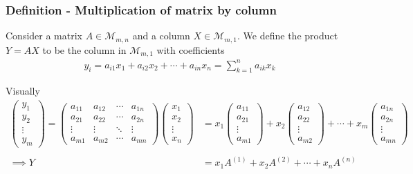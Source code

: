 \documentclass[usenames,dvipsnames,aspectratio=169,10pt]{beamer}
\numberwithin{equation}{section}
\begin{document}
\begin{frame}
\frametitle{Definition - Multiplication of matrix by column}

Consider a matrix $A \in \mathcal{M}_{m,n}$ and a column $X \in \mathcal{M}_{m,1}$. We define the product $Y = AX$ to be the column in $\mathcal{M}_{m,1}$ with coefficients
\begin{align*}
y_i = a_{i1}x_1 + a_{i2}x_2 + \cdots + a_{in}x_n = \sum_{k=1}^n a_{ik} x_k 
\end{align*}

Visually
\begin{align*}
\begin{pmatrix}
y_{1} \\
y_{2} \\
\vdots \\
y_{m} 
\end{pmatrix}
=
\begin{pmatrix}
a_{11} & a_{12} & \cdots & a_{1n} \\
a_{21} & a_{22} & \cdots & a_{2n} \\
\vdots & \vdots & \ddots & \vdots \\
a_{m1} & a_{m2} & \cdots & a_{mn}
\end{pmatrix}
\begin{pmatrix}
x_{1} \\
x_{2} \\
\vdots \\
x_{n} 
\end{pmatrix}
&=
x_{1}
\begin{pmatrix}
a_{11} \\
a_{21} \\
\vdots \\
a_{m1} 
\end{pmatrix}
+
x_{2}
\begin{pmatrix}
a_{12} \\
a_{22} \\
\vdots \\
a_{m2} 
\end{pmatrix}
+ \cdots +
x_m
\begin{pmatrix}
a_{1n} \\
a_{2n} \\
\vdots \\
a_{mn} 
\end{pmatrix}
\\ \\
\implies Y &= x_{1}A^{(1)} + x_{2}A^{(2)} + \cdots + x_{n}A^{(n)}
\end{align*}


\end{frame}
\end{document}
